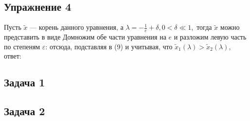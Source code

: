 \documentclass[a4paper, 12pt]{article}
\begin{document}
\subsection*{Упражнение 4}
Пусть $\tilde{x}$ --- корень данного уравнения, а $\lambda = - \frac{1}{e} + \delta, 0 < \delta \ll 1$,\
тогда $\tilde{x}$ можно представить в виде
Домножим обе части уравнения на $e$ и разложим левую часть по степеням $\varepsilon$:
\salign[]{\frac{1}{2}\varepsilon^2 = \delta e, \quad \varepsilon = \pm \sqrt{2\delta e} = \pm \sqrt{2(\lambda e + 1)},}
отсюда, подставляя в (9) и учитывая, что $\tilde{x}_1(\lambda) > \tilde{x}_2(\lambda)$, ответ:

\subsection*{Задача 1}
\lipsum[9-10]

\subsection*{Задача 2}
\lipsum[11-12]
\end{document}
